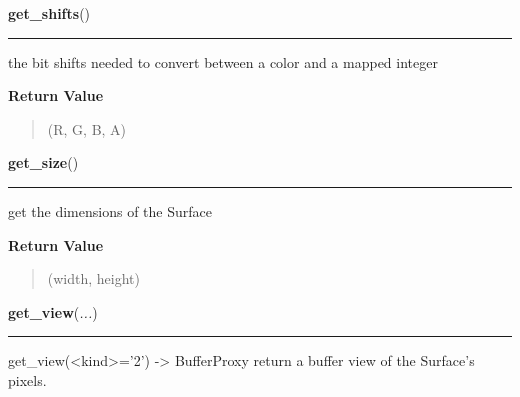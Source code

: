 \hspace{.8\funcindent}\begin{boxedminipage}{\funcwidth}

    \raggedright \textbf{get\_shifts}()

    \vspace{-1.5ex}

    \rule{\textwidth}{0.5\fboxrule}
\setlength{\parskip}{2ex}
    the bit shifts needed to convert between a color and a mapped integer

\setlength{\parskip}{1ex}
      \textbf{Return Value}
    \vspace{-1ex}

      \begin{quote}
      (R, G, B, A)

      \end{quote}

    \end{boxedminipage}

    \label{pygame:Surface:get_size}

    \vspace{0.5ex}

\hspace{.8\funcindent}\begin{boxedminipage}{\funcwidth}

    \raggedright \textbf{get\_size}()

    \vspace{-1.5ex}

    \rule{\textwidth}{0.5\fboxrule}
\setlength{\parskip}{2ex}
    get the dimensions of the Surface

\setlength{\parskip}{1ex}
      \textbf{Return Value}
    \vspace{-1ex}

      \begin{quote}
      (width, height)

      \end{quote}

    \end{boxedminipage}

    \label{pygame:Surface:get_view}

    \vspace{0.5ex}

\hspace{.8\funcindent}\begin{boxedminipage}{\funcwidth}

    \raggedright \textbf{get\_view}(\textit{...})

    \vspace{-1.5ex}

    \rule{\textwidth}{0.5\fboxrule}
\setlength{\parskip}{2ex}
    get\_view({\textless}kind{\textgreater}='2') -{\textgreater} 
    BufferProxy return a buffer view of the Surface's pixels.

\setlength{\parskip}{1ex}
    \end{boxedminipage}

